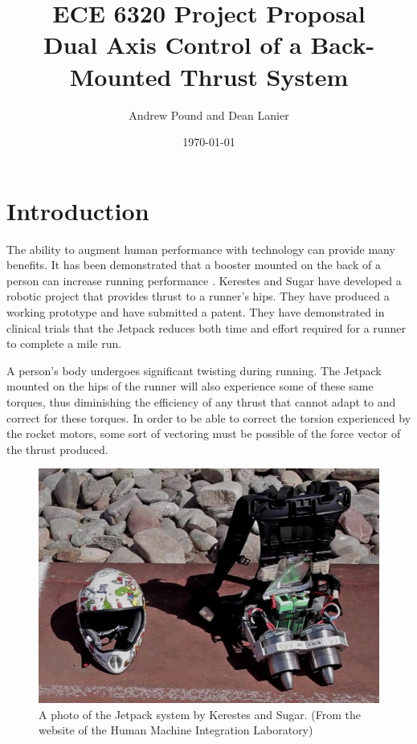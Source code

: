 \documentclass[12pt, twocolumn]{article}
\title{ECE 6320 Project Proposal\\
  Dual Axis Control of a Back-Mounted Thrust System
}
\author{Andrew Pound and Dean Lanier}
\date{\today}
\begin{document}
\maketitle



\section{Introduction}
The ability to augment human performance with technology can provide
many benefits.  It has been demonstrated that a booster mounted on the
back of a person can increase running performance
\cite{sugar2014systems}.  
Kerestes and Sugar have developed a robotic project that provides
thrust to a runner's hips.  They have produced a working prototype and
have submitted a patent\cite{sugar2014systems}. 
They have demonstrated in clinical trials  that the Jetpack reduces
both time and effort required for a runner to complete a mile run.

A person's body undergoes significant twisting during running.  The
Jetpack 
mounted on the hips of the runner will also experience some of these
same torques, thus diminishing the efficiency of any thrust that
cannot adapt to and correct for these torques.
In order to be able to correct the torsion experienced by the rocket
motors, some sort of vectoring must be possible of the force vector
of the thrust produced. 


\begin{figure}[tbh]
  \centering
  \includegraphics[width=.8\linewidth]{../figs/jetpack}
  \caption{A photo of the Jetpack system by Kerestes and Sugar.  (From
    the website of the Human Machine Integration Laboratory)} 
  \label{fig:jetpack}
\end{figure}
\end{document}
